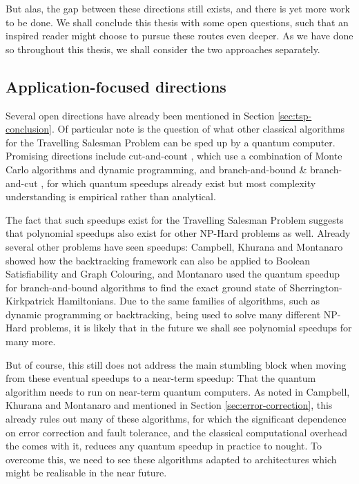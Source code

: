 But alas, the gap between these directions still exists, and there is yet more work to be done. We shall conclude this thesis with some open questions, such that an inspired reader might choose to pursue these routes even deeper. As we have done so throughout this thesis, we shall consider the two approaches separately.

\subsection{Application-focused directions}

Several open directions have already been mentioned in Section \ref{sec:tsp-conclusion}. Of particular note is the question of what other classical algorithms for the Travelling Salesman Problem can be sped up by a quantum computer. Promising directions include cut-and-count \cite{bjorklund14,bodlaender15,cygan11}, which use a combination of Monte Carlo algorithms and dynamic programming, and branch-and-bound \& branch-and-cut \cite{little1963, padberg1991, applegate2006}, for which quantum speedups already exist but most complexity understanding is empirical rather than analytical.

The fact that such speedups exist for the Travelling Salesman Problem suggests that polynomial speedups also exist for other NP-Hard problems as well. Already several other problems have seen speedups: Campbell, Khurana and Montanaro \cite{campbell2019} showed how the backtracking framework can also be applied to Boolean Satisfiability and Graph Colouring, and Montanaro \cite{montanaro2019} used the quantum speedup for branch-and-bound algorithms to find the exact ground state of Sherrington-Kirkpatrick Hamiltonians. Due to the same families of algorithms, such as dynamic programming or backtracking, being used to solve many different NP-Hard problems, it is likely that in the future we shall see polynomial speedups for many more.

But of course, this still does not address the main stumbling block when moving from these eventual speedups to a near-term speedup: That the quantum algorithm needs to run on near-term quantum computers. As noted in Campbell, Khurana and Montanaro \cite{campbell2019} and mentioned in Section \ref{sec:error-correction}, this already rules out many of these algorithms, for which the significant dependence on error correction and fault tolerance, and the classical computational overhead the comes with it, reduces any quantum speedup in practice to nought. To overcome this, we need to see these algorithms adapted to architectures which might be realisable in the near future.

